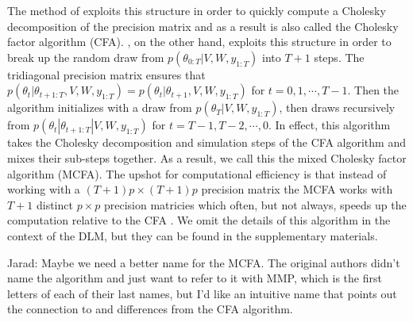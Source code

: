\documentclass{article}
\newcommand{\jarad}[1]{{\color{red} Jarad: #1}}
\begin{document}
The method of  exploits this structure in order to quickly compute a Cholesky decomposition of the precision matrix and as a result is also called the Cholesky factor algorithm (CFA). , on the other hand, exploits this structure in order to break up the random draw from $p(\theta_{0:T}|V,W,y_{1:T})$ into $T+1$ steps. The tridiagonal precision matrix ensures that $p(\theta_{t}|\theta_{t+1:T},V,W,y_{1:T}) = p(\theta_{t}|\theta_{t+1},V,W,y_{1:T})$ for $t=0,1,\cdots,T-1$. Then the algorithm initializes with a draw from $p(\theta_T|V,W,y_{1:T})$, then draws recursively from $p(\theta_{t}|\theta_{t+1:T}|V,W,y_{1:T})$ for $t=T-1,T-2,\cdots,0$. In effect, this algorithm takes the Cholesky decomposition and simulation steps of the CFA algorithm and mixes their sub-steps together.  As a result, we call this the mixed Cholesky factor algorithm (MCFA). The upshot for computational efficiency is that instead of working with a $(T+1)p\times (T+1)p$ precision matrix the MCFA works with $T+1$ distinct $p\times p$ precision matricies which often, but not always, speeds up the computation relative to the CFA \cite{mccausland2011simulation}. We omit the details of this algorithm in the context of the DLM, but they can be found in the supplementary materials.

\jarad{Maybe we need a better name for the MCFA. The original authors didn't name the algorithm and just want to refer to it with MMP, which is the first letters of each of their last names, but I'd like an intuitive name that points out the connection to and differences from the CFA algorithm.}
\end{document}
